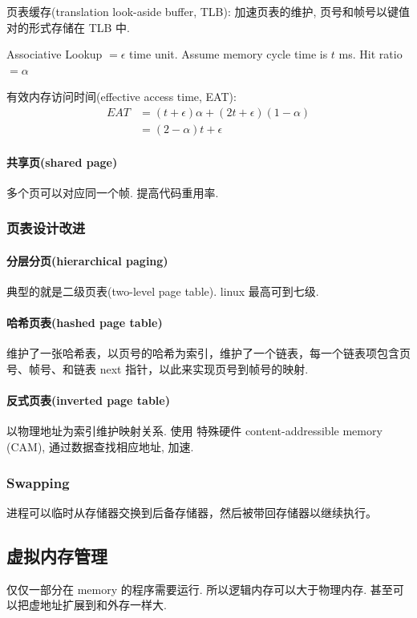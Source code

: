 页表缓存(translation look-aside buffer, TLB): 加速页表的维护, 页号和帧号以键值对的形式存储在 TLB 中. 

Associative Lookup $=\epsilon$ time unit. Assume memory cycle time is $t$ ms. Hit ratio $=\alpha$

有效内存访问时间(effective access time, EAT):
\begin{align*}
    EAT &= (t+\epsilon)\alpha+(2t+\epsilon)(1-\alpha)\\
    &=(2-\alpha)t+\epsilon 
\end{align*}


\paragraph{共享页(shared page)}多个页可以对应同一个帧. 提高代码重用率. 

\subsubsection{页表设计改进}
\paragraph{分层分页(hierarchical paging)}典型的就是二级页表(two-level page table). linux 最高可到七级. 

\paragraph{哈希页表(hashed page table)}维护了一张哈希表，以页号的哈希为索引，维护了一个链表，每一个链表项包含页号、帧号、和链表 next 指针，以此来实现页号到帧号的映射.

\paragraph{反式页表(inverted page table)}以物理地址为索引维护映射关系. 使用 特殊硬件 content-addressible memory (CAM), 通过数据查找相应地址,  加速. 

\subsubsection{Swapping}
进程可以临时从存储器交换到后备存储器，然后被带回存储器以继续执行。

\subsection{虚拟内存管理}
仅仅一部分在 memory 的程序需要运行. 所以逻辑内存可以大于物理内存. 甚至可以把虚地址扩展到和外存一样大. 

